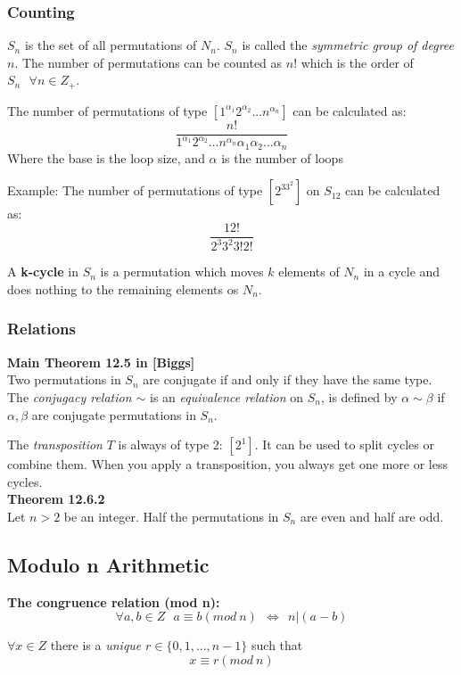 \documentclass{article}
\begin{document}
	\subsubsection*{Counting}
	$S_n$ is the set of all permutations of $N_n$. $S_n$ is called the \textit{symmetric group of degree $n$}. The number of permutations can be counted as $n!$ which is the order of $S_n \ \ \ \forall n \in Z_+$.
	
	The number of permutations of type $[1^{\alpha_1}2^{\alpha_2}...n^{\alpha_n}]$ can be calculated as: 
	$$
	\frac{n!}{1^{\alpha_1}2^{\alpha_2}...n^{\alpha_n}\alpha_1\alpha_2...\alpha_n} 
	$$ 
	Where the base is the loop size, and $\alpha$ is the number of loops
	
	Example: The number of permutations of type $[2^33^2]$ on $S_{12}$ can be calculated as: 
	$$
	\frac{12!}{2^{3}3^{2}3!2!}
	$$
	
	A \textbf{k-cycle} in $S_n$ is a permutation which moves $k$ elements of $N_n$ in a cycle and does nothing to the remaining elements os $N_n$.
	
	\subsubsection*{Relations}
	\textbf{Main Theorem 12.5 in [Biggs]} \\
	Two permutations in $S_n$ are conjugate if and only if they have the same type. \\
	
	The \textit{conjugacy relation $\sim$} is an \textit{equivalence relation} on $S_n$, is defined by $\alpha \sim \beta$ if $\alpha,\beta$ are conjugate permutations in $S_n$.
	
	The \textit{transposition} $T$ is always of type 2: $[2^1]$. It can be used to split cycles or combine them. When you apply a transposition, you always get one more or less cycles. \\
	
	\textbf{Theorem 12.6.2} \\
	Let $n > 2$ be an integer. Half the permutations in $S_n$ are even and half are odd.
	
	\subsection*{Modulo n Arithmetic}
	\textbf{The congruence relation (mod n):}
	$$
	\forall a,b \in Z \ \ \ a \equiv b (mod \ n) \ \  \iff \ \ n|(a-b)
	$$
	
	$\forall x \in Z$ there is a \textit{unique} $r \in \{0,1,...,n-1\}$ such that
	$$
	x \equiv r (mod \ n)
	$$
	
\end{document}
